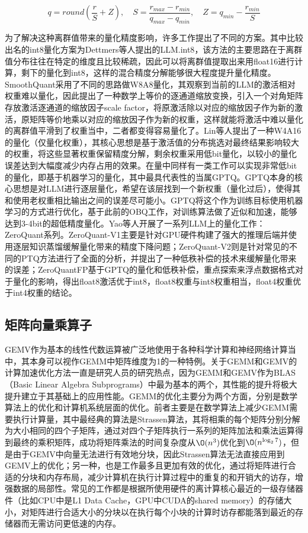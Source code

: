 \begin{equation}
    q = round\left(\frac{r}{S} + Z\right), \quad S=\frac{r_{max}-r_{min}}{q_{max}-q_{min}}, \quad Z=q_{min}-\frac{r_{min}}{S}
    \label{QuantEqu}
\end{equation}

为了解决这种离群值带来的量化精度影响，许多工作提出了不同的方案。其中比较出名的int8量化方案为Dettmers等人提出的LLM.int8\cite{LLMINT8}，该方法的主要思路在于离群值分布往往在特定的维度且比较稀疏，因此可以将离群值提取出来用float16进行计算，剩下的量化到int8，这样的混合精度分解能够很大程度提升量化精度。SmoothQuant采用了不同的思路\cite{SmoothQuant}做W8A8量化，其观察到当前的LLM的激活相对权重难以量化，因此提出了一种数学上等价的逐通道缩放变换，引入一个对角矩阵存放激活逐通道的缩放因子scale factor，将原激活除以对应的缩放因子作为新的激活，原矩阵等价地乘以对应的缩放因子作为新的权重，这样就能将激活中难以量化的离群值平滑到了权重当中，二者都变得容易量化了。Lin等人提出了一种W4A16的量化（仅量化权重）\cite{AWQ}，其核心思想是基于激活值的分布挑选对最终结果影响较大的权重，将这些显著权重保留精度分解，剩余权重采用低bit量化，以较小的量化误差达到大幅度减少内存占用的效果。在量中同样有一类工作可以实现非常低bit的量化，即基于机器学习的量化，其中最具代表性的当属GPTQ。GPTQ\cite{GPTQ}本身的核心思想是对LLM进行逐层量化，希望在该层找到一个新权重（量化过后），使得其和使用老权重相比输出之间的误差尽可能小。GPTQ将这个作为训练目标使用机器学习的方式进行优化，基于此前的OBQ工作\cite{OBQ}，对训练算法做了近似和加速，能够达到3-4bit的超低精度量化。Yao等人开展了一系列LLM上的量化工作：ZeroQuant系列\cite{ZeroQuant1,ZeroQuant2,ZeroQuantFP}。ZeroQuant-V1主要是针对GPU硬件构建了强大的推理后端并使用逐层知识蒸馏缓解量化带来的精度下降问题\cite{ZeroQuant1}；ZeroQuant-V2则是针对常见的不同的PTQ方法进行了全面的分析，并提出了一种低秩补偿的技术来缓解量化带来的误差\cite{ZeroQuant2}；ZeroQuantFP基于GPTQ的量化和低秩补偿，重点探索来浮点数据格式对于量化的影响，得出float8激活优于int8，float8权重与int8权重相当，float4权重优于int4权重的结论\cite{ZeroQuantFP}。

\subsection{矩阵向量乘算子}
GEMV作为基本的线性代数运算被广泛地使用于各种科学计算和神经网络计算当中，其本身可以视作GEMM中矩阵维度为1的一种特例。关于GEMM和GEMV的计算加速优化方法一直是研究人员的研究热点，因为GEMM和GEMV作为BLAS（Basic Linear Algebra Subprograms）中最为基本的两个，其性能的提升将极大提升建立于其基础上的应用性能。GEMM的优化主要分为两个方面，分别是数学算法上的优化和计算机系统层面的优化。前者主要是在数学算法上减少GEMM需要执行计算量，其中最经典的算法是Strassen算法\cite{Strassen}，其将相乘的每个矩阵分别分解为大小相同的四个子矩阵，通过对四个子矩阵执行一系列的矩阵加法和乘法运算得到最终的乘积矩阵，成功将矩阵乘法的时间复杂度从$\O(n^3)$优化到$\O(n^{\log_{2}7})$，但是由于GEMV中向量无法进行有效地分块，因此Strassen算法无法直接应用到GEMV上的优化；另一种，也是工作最多且更加有效的优化，通过将矩阵进行合适的分块和内存布局，减少计算机在执行计算过程中的重复的和开销大的访存，增强数据的局部性。常见的工作都是根据所使用硬件的离计算核心最近的一级存储器件（比如CPU中是L1 Data Cache，GPU中CUDA的shared memory\cite{Cuda}）的存储大小，对矩阵进行合适大小的分块以在执行每个小块的计算时访存都能落到最近的存储器而无需访问更低速的内存。

